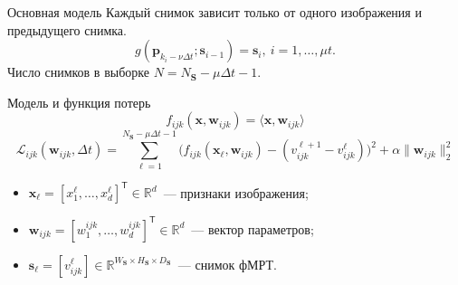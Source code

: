 \documentclass{beamer}
\newcommand{\T}{^{\mathsf{T}}}
\begin{document}
\begin{frame}{Основная модель}
    Каждый снимок зависит только от одного изображения и предыдущего снимка.
	\begin{equation*}
		\label{eq15}
		g(\mathbf{p}_{k_i - \nu \Delta t}; \mathbf{s}_{i-1}) = \mathbf{s}_i, \ i = 1, \ldots, \mu t.
	\end{equation*}
    Число снимков в выборке $N = N_{\mathbf{S}} - \mu \Delta t - 1$.
    \begin{block}{Модель и функция потерь}
        \begin{equation*}
            \label{eq15}
            f_{ijk}(\mathbf{x}, \mathbf{w}_{ijk}) = \langle \mathbf{x}, \mathbf{w}_{ijk} \rangle
        \end{equation*}
        \begin{equation*}
            \label{eq16}
            \mathcal{L}_{ijk}(\mathbf{w}_{ijk}, \Delta t) = \sum\limits_{\ell = 1}^{N_{\mathbf{S}} - \mu \Delta t - 1} \big(f_{ijk}(\mathbf{x}_{\ell}, \mathbf{w}_{ijk}) - (v^{\ell + 1}_{ijk} - v^{\ell}_{ijk})\big)^2 + \alpha \| \mathbf{w}_{ijk} \|_2^2
        \end{equation*}
        \begin{itemize}
            \item $\mathbf{x}_{\ell} = [x^{\ell}_1, \ldots, x^{\ell}_{d}]\T \in \mathbb{R}^{d}$~--- признаки изображения;
            \item $\mathbf{w}_{ijk} = [w^{ijk}_1, \ldots, w^{ijk}_{d}]\T \in \mathbb{R}^{d}$~--- вектор параметров;
            \item $\mathbf{s}_{\ell} = [v^{\ell}_{ijk}] \in \mathbb{R}^{W_{\mathbf{S}} \times H_{\mathbf{S}} \times D_{\mathbf{S}}}$~--- снимок фМРТ.
        \end{itemize}
    \end{block}
\end{frame}
\end{document}
